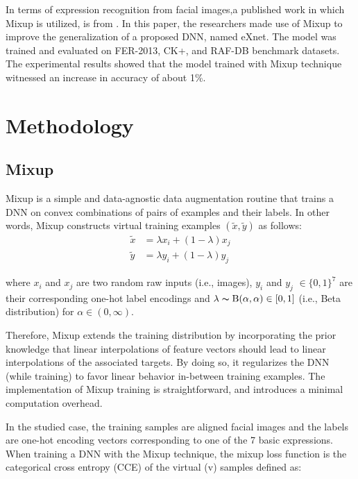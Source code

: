 \documentclass[10pt,twocolumn,letterpaper]{article}
\begin{document}
In terms of expression recognition from facial images,a published work in which Mixup is utilized, is from  \cite{riaz2020exnet}. In this paper, the researchers made use of Mixup to improve the generalization of a proposed DNN, named eXnet. The model was trained and evaluated on FER-2013, CK+, and RAF-DB benchmark datasets. The experimental results showed that the model trained with Mixup technique witnessed an increase in accuracy of about 1\%. 



\section{Methodology}
\subsection{Mixup}
Mixup \cite{zhang2017mixup} is a simple and data-agnostic data augmentation routine that trains a DNN on convex combinations of pairs of examples and their labels. In other words, Mixup constructs virtual training examples $(\tilde{x},\tilde{y})$ as follows:
\begin{align}
\tilde{x} &= \lambda x_i+(1-\lambda)x_j  \nonumber \\ 
\tilde{y} &= \lambda y_i+(1-\lambda)y_j
\label{eq:mixup}
\end{align}


\noindent where $x_i$ and $x_j$ are two random raw inputs (i.e., images), $y_i$ and $y_j$ $\in \{0,1\}^7$ are their corresponding one-hot label encodings  and  $\lambda \thicksim \mathrm{B}(\alpha,\alpha) \in [0,1]$ (i.e., Beta distribution) for $\alpha \in (0, \infty)$. 


Therefore, Mixup extends the training distribution by incorporating the prior knowledge that linear interpolations of feature vectors should lead to linear interpolations of the associated targets. By doing so, it regularizes the DNN (while training) to favor linear behavior in-between training examples. The implementation of Mixup training is straightforward, and introduces a minimal computation overhead. 

In the studied case, the training samples are aligned facial images and the labels are one-hot encoding vectors corresponding to one of the 7 basic expressions. When training a DNN with the Mixup technique, the mixup loss function is the categorical cross entropy (CCE) of the virtual (v) samples defined as:
\end{document}
